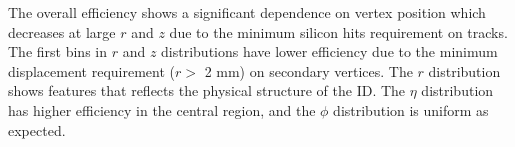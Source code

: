 The overall efficiency shows a significant dependence on vertex position which decreases at large $r$ and $z$ due to the minimum silicon hits requirement on tracks. The first bins in $r$ and $z$ distributions have lower efficiency due to the minimum displacement requirement ($r > $ 2 mm) on secondary vertices. The $r$ distribution shows features that reflects the physical structure of the ID. The $\eta$ distribution has higher efficiency in the central region, and the $\phi$ distribution is uniform as expected.


\begin{figure}[!htb]
    \centering
     \\

\end{figure}
